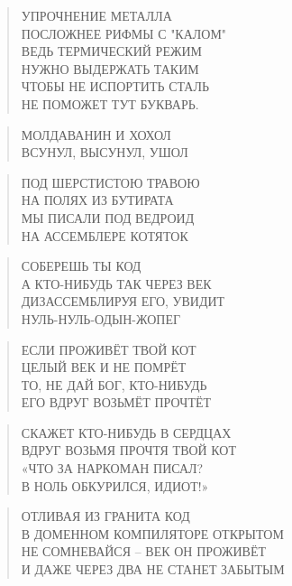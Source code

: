 \poemtitle{***}
\begin{verse}
УПРОЧНЕНИЕ МЕТАЛЛА\\
ПОСЛОЖНЕЕ РИФМЫ С "КАЛОМ"\\
ВЕДЬ ТЕРМИЧЕСКИЙ РЕЖИМ\\
НУЖНО ВЫДЕРЖАТЬ ТАКИМ\\
ЧТОБЫ НЕ ИСПОРТИТЬ СТАЛЬ\\
НЕ ПОМОЖЕТ ТУТ БУКВАРЬ.
\end{verse}

\poemtitle{***}
\begin{verse}
МОЛДАВАНИН И ХОХОЛ\\
ВСУНУЛ, ВЫСУНУЛ, УШОЛ
\end{verse}

\poemtitle{***}
\begin{verse}
ПОД ШЕРСТИСТОЮ ТРАВОЮ\\
НА ПОЛЯХ ИЗ БУТИРАТА\\
МЫ ПИСАЛИ ПОД ВЕДРОИД\\
НА АССЕМБЛЕРЕ КОТЯТОК
\end{verse}

\poemtitle{***}
\begin{verse}
СОБЕРЕШЬ ТЫ КОД\\
А КТО-НИБУДЬ ТАК ЧЕРЕЗ ВЕК\\
ДИЗАССЕМБЛИРУЯ ЕГО, УВИДИТ\\
НУЛЬ-НУЛЬ-ОДЫН-ЖОПЕГ
\end{verse}

\poemtitle{***}
\begin{verse}
ЕСЛИ ПРОЖИВЁТ ТВОЙ КОТ\\
ЦЕЛЫЙ ВЕК И НЕ ПОМРЁТ\\
ТО, НЕ ДАЙ БОГ, КТО-НИБУДЬ\\
ЕГО ВДРУГ ВОЗЬМЁТ ПРОЧТЁТ
\end{verse}

\poemtitle{***}
\begin{verse}
СКАЖЕТ КТО-НИБУДЬ В СЕРДЦАХ\\
ВДРУГ ВОЗЬМЯ ПРОЧТЯ ТВОЙ КОТ\\
«ЧТО ЗА НАРКОМАН ПИСАЛ?\\
В НОЛЬ ОБКУРИЛСЯ, ИДИОТ!»
\end{verse}

\poemtitle{***}
\begin{verse}
ОТЛИВАЯ ИЗ ГРАНИТА КОД\\
В ДОМЕННОМ КОМПИЛЯТОРЕ ОТКРЫТОМ\\
НЕ СОМНЕВАЙСЯ -- ВЕК ОН ПРОЖИВЁТ\\
И ДАЖЕ ЧЕРЕЗ ДВА НЕ СТАНЕТ ЗАБЫТЫМ
\end{verse}

